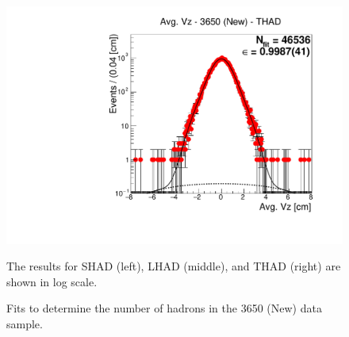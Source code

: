 \begin{figure}[H]
\includegraphics[scale=0.25]{figures/plots/nonDDbar_fit_results/3650_new/fit_new_3650_data_THAD.pdf}
\caption{Fits to determine the number of hadrons in the 3650 (New) data sample.}
{The results for SHAD (left), LHAD (middle), and THAD (right) are shown in log scale.}
\label{fig:hadron_fits_3650_new}
\end{figure}


